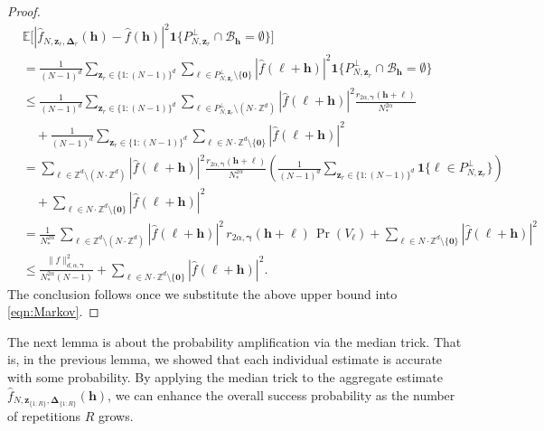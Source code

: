 \documentclass[pdflatex,sn-basic,Numbered]{sn-jnl}%
\newcommand{\bszero}{\boldsymbol{0}}
\newcommand{\bsh}{\boldsymbol{h}}
\newcommand{\bsl}{\boldsymbol{\ell}}
\newcommand{\bsz}{\boldsymbol{z}}
\newcommand{\bsgamma}{\boldsymbol{\gamma}}
\newcommand{\bsDelta}{\boldsymbol{\Delta}}
\newcommand{\ZZ}{\mathbb{Z}}
\newcommand{\e}{\mathbb{E}}
\newcommand{\bsone}{\boldsymbol{1}}
\theoremstyle{thmstyleone}%
\theoremstyle{thmstyletwo}%
\begin{document}
\begin{proof}
\begin{align*}
    &\e\Big[|\widehat{f}_{N,\bsz_r,\bsDelta_r}(\bsh)-\widehat{f}(\bsh)|^2\bsone\{P_{N,\boldsymbol{z}_r}^\perp\cap \mathcal{B}_{\bsh}= \emptyset\}\Big]\\
    & = \frac{1}{(N-1)^d}\sum_{\bsz_r\in \{1{:}(N-1)\}^d}\sum_{\bsl \in P_{N,\boldsymbol{z}_r}^\perp\setminus \{\bszero\}}|\widehat{f}(\bsl+\bsh)|^2 \bsone\{P_{N,\boldsymbol{z}_r}^\perp\cap \mathcal{B}_{\bsh}= \emptyset\}\\
    & \leq \frac{1}{(N-1)^d}\sum_{\bsz_r\in \{1{:}(N-1)\}^d}\sum_{\bsl \in P_{N,\boldsymbol{z}_r}^\perp\setminus (N\cdot \ZZ^d) }|\widehat{f}(\bsl+\bsh)|^2 \frac{r_{2\alpha, \bsgamma}(\bsh+\bsl) }{N_*^{2\alpha}}\\
    & \quad +\frac{1}{(N-1)^d}\sum_{\bsz_r\in \{1{:}(N-1)\}^d}\sum_{\bsl \in N\cdot \ZZ^d\setminus \{\bszero\} }|\widehat{f}(\bsl+\bsh)|^2 \\
    & =\sum_{\bsl \in \ZZ^d\setminus (N\cdot \ZZ^d)}|\widehat{f}(\bsl+\bsh)|^2\frac{r_{2\alpha, \bsgamma}(\bsh+\bsl) }{N_*^{2\alpha}}\left(\frac{1}{(N-1)^d}\sum_{\bsz_r\in \{1{:}(N-1)\}^d}\bsone\{\bsl \in P_{N,\boldsymbol{z}_r}^\perp\}\right)\\
    & \quad +\sum_{\bsl \in N\cdot \ZZ^d\setminus \{\bszero\} }|\widehat{f}(\bsl+\bsh)|^2\\
    & = \frac{1}{N_*^{2\alpha}}\,\sum_{\bsl \in \ZZ^d\setminus (N\cdot \ZZ^d)}|\widehat{f}(\bsl+\bsh)|^2 \, r_{2\alpha, \bsgamma}(\bsh+\bsl)\,  \Pr(V_{\bsl})+\sum_{\bsl \in N\cdot \ZZ^d\setminus \{\bszero\} }|\widehat{f}(\bsl+\bsh)|^2\\
    & \leq  \frac{\|f\|^2_{d,\alpha,\bsgamma}}{N_*^{2\alpha}(N-1) }+\sum_{\bsl \in N\cdot \ZZ^d\setminus \{\bszero\} }|\widehat{f}(\bsl+\bsh)|^2.
\end{align*}
The conclusion follows once we substitute the above upper bound into \eqref{eqn:Markov}.
\end{proof}

The next lemma is about the probability amplification via the median trick. That is, in the previous lemma, we showed that each individual estimate is accurate with some probability. By applying the median trick to the aggregate estimate $\widehat{f}_{N,\bsz_{\{1{:}R\}},\bsDelta_{\{1{:}R\}}}(\bsh)$, we can enhance the overall success probability as the number of repetitions $R$ grows.
\end{document}
